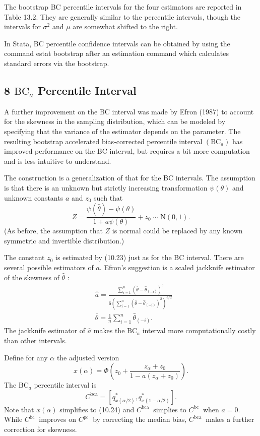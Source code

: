 \documentclass[10pt]{article}
\begin{document}
The bootstrap BC percentile intervals for the four estimators are reported in Table 13.2. They are generally similar to the percentile intervals, though the intervals for $\sigma^{2}$ and $\mu$ are somewhat shifted to the right.

In Stata, BC percentile confidence intervals can be obtained by using the command estat bootstrap after an estimation command which calculates standard errors via the bootstrap.

\subsection{8 $\mathrm{BC}_{a}$ Percentile Interval}
A further improvement on the BC interval was made by Efron (1987) to account for the skewness in the sampling distribution, which can be modeled by specifying that the variance of the estimator depends on the parameter. The resulting bootstrap accelerated bias-corrected percentile interval $\left(\mathrm{BC}_{a}\right)$ has improved performance on the BC interval, but requires a bit more computation and is less intuitive to understand.

The construction is a generalization of that for the BC intervals. The assumption is that there is an unknown but strictly increasing transformation $\psi(\theta)$ and unknown constants $a$ and $z_{0}$ such that
$$
Z=\frac{\psi(\widehat{\theta})-\psi(\theta)}{1+a \psi(\theta)}+z_{0} \sim \mathrm{N}(0,1) .
$$
(As before, the assumption that $Z$ is normal could be replaced by any known symmetric and invertible distribution.)

The constant $z_{0}$ is estimated by (10.23) just as for the BC interval. There are several possible estimators of $a$. Efron's suggestion is a scaled jackknife estimator of the skewness of $\widehat{\theta}$ :
$$
\begin{aligned}
&\widehat{a}=\frac{\sum_{i=1}^{n}\left(\bar{\theta}-\widehat{\theta}_{(-i)}\right)^{3}}{6\left(\sum_{i=1}^{n}\left(\bar{\theta}-\widehat{\theta}_{(-i)}\right)^{2}\right)^{3 / 2}} \\
&\bar{\theta}=\frac{1}{n} \sum_{i=1}^{n} \widehat{\theta}_{(-i)} .
\end{aligned}
$$
The jackknife estimator of $\widehat{a}$ makes the $\mathrm{BC}_{a}$ interval more computationally costly than other intervals.

Define for any $\alpha$ the adjusted version
$$
x(\alpha)=\Phi\left(z_{0}+\frac{z_{\alpha}+z_{0}}{1-a\left(z_{\alpha}+z_{0}\right)}\right) .
$$
The $\mathrm{BC}_{a}$ percentile interval is
$$
C^{\mathrm{bca}}=\left[q_{x(\alpha / 2)}^{*}, q_{x(1-\alpha / 2)}^{*}\right] .
$$
Note that $x(\alpha)$ simplifies to (10.24) and $C^{\text {bca }}$ simplies to $C^{\text {bc }}$ when $a=0$. While $C^{\text {bc }}$ improves on $C^{\text {pc }}$ by correcting the median bias, $C^{\text {bca }}$ makes a further correction for skewness.
\end{document}
